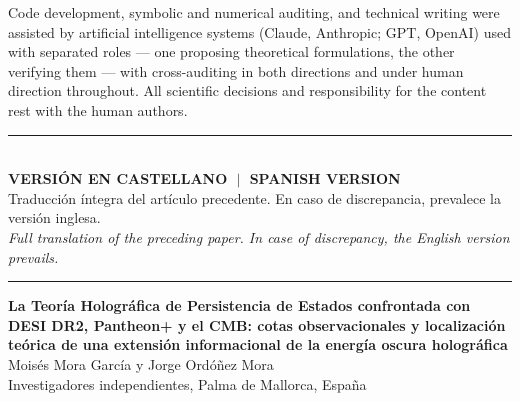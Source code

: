 \documentclass[aps,prd,twocolumn,superscriptaddress,nofootinbib,floatfix]{revtex4-2}
\begin{document}
\begin{acknowledgments}
Code development, symbolic and numerical auditing, and technical writing
were assisted by artificial intelligence systems (Claude, Anthropic;
GPT, OpenAI) used with separated roles --- one proposing theoretical
formulations, the other verifying them --- with cross-auditing in both
directions and under human direction throughout. All scientific
decisions and responsibility for the content rest with the human
authors.
\end{acknowledgments}


\clearpage
\onecolumngrid
\begin{center}
\rule{\textwidth}{0.5pt}\\[4pt]
{\large\bfseries VERSI\'ON EN CASTELLANO $\;\vert\;$ SPANISH VERSION}\\[2pt]
{\small Traducci\'on \'integra del art\'iculo precedente. En caso de
discrepancia, prevalece la versi\'on inglesa.}\\[2pt]
{\small\itshape Full translation of the preceding paper. In case of
discrepancy, the English version prevails.}\\[4pt]
\rule{\textwidth}{0.5pt}
\end{center}
\twocolumngrid

\begin{center}
{\large\bfseries La Teor\'ia Hologr\'afica de Persistencia de Estados
confrontada con DESI DR2, Pantheon+ y el CMB: cotas observacionales y
localizaci\'on te\'orica de una extensi\'on informacional de la energ\'ia
oscura hologr\'afica}\\[6pt]
{Mois\'es Mora Garc\'ia y Jorge Ord\'o\~nez Mora}\\[2pt]
{\small Investigadores independientes, Palma de Mallorca, Espa\~na}
\end{center}

\vspace{4pt}
\end{document}
